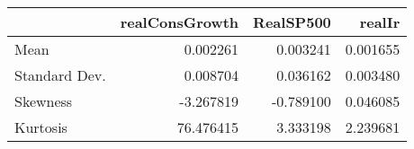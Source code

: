 \begin{tabular}{lrrr}
\toprule
{} &  realConsGrowth &  RealSP500 &    realIr \\
\midrule
Mean          &        0.002261 &   0.003241 &  0.001655 \\
Standard Dev. &        0.008704 &   0.036162 &  0.003480 \\
Skewness      &       -3.267819 &  -0.789100 &  0.046085 \\
Kurtosis      &       76.476415 &   3.333198 &  2.239681 \\
\bottomrule
\end{tabular}

